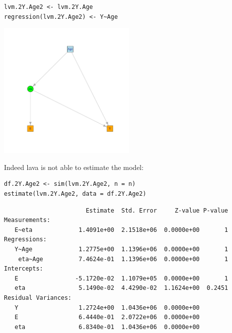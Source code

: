 \documentclass{article}
\begin{document}
\lstset{language=r,label= ,caption= ,captionpos=b,numbers=none}
\begin{lstlisting}
lvm.2Y.Age2 <- lvm.2Y.Age
regression(lvm.2Y.Age2) <- Y~Age
\end{lstlisting}

\begin{center}
\includegraphics[width=0.5\textwidth]{./figures/show-bivariateLVM-Age2.pdf}
\end{center}

Indeed lava is not able to estimate the model:
\lstset{language=r,label= ,caption= ,captionpos=b,numbers=none}
\begin{lstlisting}
df.2Y.Age2 <- sim(lvm.2Y.Age2, n = n)
estimate(lvm.2Y.Age2, data = df.2Y.Age2)
\end{lstlisting}

\begin{verbatim}
                       Estimate  Std. Error     Z-value P-value
Measurements:                                                  
   E~eta             1.4091e+00  2.1518e+06  0.0000e+00       1
Regressions:                                                   
   Y~Age             1.2775e+00  1.1396e+06  0.0000e+00       1
    eta~Age          7.4624e-01  1.1396e+06  0.0000e+00       1
Intercepts:                                                    
   E                -5.1720e-02  1.1079e+05  0.0000e+00       1
   eta               5.1490e-02  4.4290e-02  1.1624e+00  0.2451
Residual Variances:                                            
   Y                 1.2724e+00  1.0436e+06  0.0000e+00        
   E                 6.4440e-01  2.0722e+06  0.0000e+00        
   eta               6.8340e-01  1.0436e+06  0.0000e+00
\end{verbatim}
\end{document}
